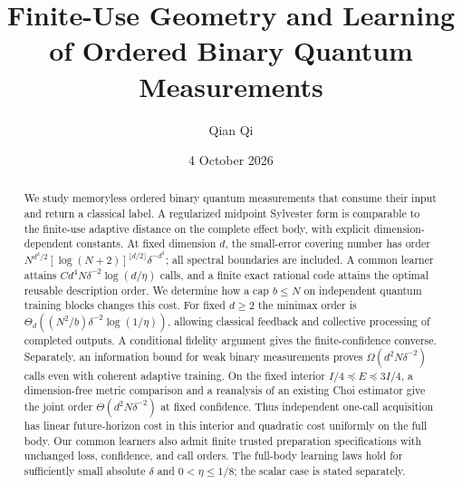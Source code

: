 \documentclass[11pt]{amsart}
\title[Finite-use measurement geometry and learning]{Finite-Use Geometry and Learning of Ordered Binary Quantum Measurements}
\author{Qian Qi}
\date{4 October 2026}
\numberwithin{equation}{section}
\theoremstyle{definition}\newtheorem{definition}[theorem]{Definition}
\theoremstyle{remark}\newtheorem{remark}[theorem]{Remark}
\begin{document}
\raggedbottom
\begin{abstract}
We study memoryless ordered binary quantum measurements that consume
their input and return a classical label.  A regularized midpoint
Sylvester form is comparable to the finite-use adaptive distance on
the complete effect body, with explicit dimension-dependent constants.
At fixed dimension $d$, the small-error covering number has order
\mbox{$N^{d^2/2}[\log(N+2)]^{\lfloor d/2\rfloor}\delta^{-d^2}$};
all spectral boundaries are included.  A common learner attains
$Cd^4N\delta^{-2}\log(d/\eta)$ calls, and a finite exact rational
code attains the optimal reusable description order.
We determine how a cap $b\le N$ on independent quantum training
blocks changes this cost.  For fixed $d\ge2$ the minimax order is
$\Theta_d((N^2/b)\delta^{-2}\log(1/\eta))$, allowing classical
feedback and collective processing of completed outputs.
A conditional fidelity argument gives the finite-confidence converse.
Separately, an information bound for weak binary measurements proves
$\Omega(d^2N\delta^{-2})$ calls even with coherent adaptive training.
On the fixed interior $I/4\preceq E\preceq3I/4$, a dimension-free
metric comparison and a reanalysis of an existing Choi estimator give
the joint order $\Theta(d^2N\delta^{-2})$ at fixed confidence.
Thus independent one-call acquisition has linear future-horizon cost
in this interior and quadratic cost uniformly on the full body.
Our common learners also admit finite trusted preparation specifications
with unchanged loss, confidence, and call orders.
The full-body learning laws hold for sufficiently small absolute
$\delta$ and $0<\eta\le1/8$; the scalar case is stated separately.
\end{abstract}
\maketitle













\appendix


\end{document}
